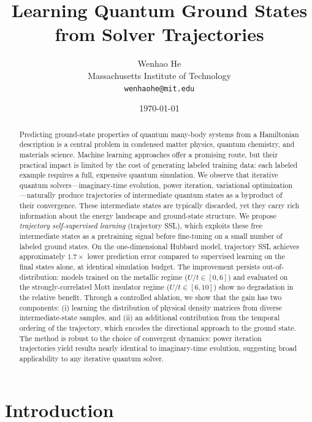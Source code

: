 \documentclass[12pt]{article}
\title{\textbf{Learning Quantum Ground States from Solver Trajectories}}
\author{Wenhao He\\
\small Massachusetts Institute of Technology\\
\small \texttt{wenhaohe@mit.edu}}
\date{\today}
\begin{document}
\maketitle

\begin{abstract}
Predicting ground-state properties of quantum many-body systems from a Hamiltonian
description is a central problem in condensed matter physics, quantum chemistry, and
materials science. Machine learning approaches offer a promising route, but their
practical impact is limited by the cost of generating labeled training data: each
labeled example requires a full, expensive quantum simulation.
We observe that iterative quantum solvers---imaginary-time evolution, power iteration,
variational optimization---naturally produce trajectories of intermediate quantum states
as a byproduct of their convergence.
These intermediate states are typically discarded, yet they carry rich information about
the energy landscape and ground-state structure.
We propose \emph{trajectory self-supervised learning} (trajectory SSL), which exploits
these free intermediate states as a pretraining signal before fine-tuning on a small
number of labeled ground states.
On the one-dimensional Hubbard model, trajectory SSL achieves approximately $1.7\times$
lower prediction error compared to supervised learning on the final states alone,
at identical simulation budget.
The improvement persists out-of-distribution: models trained on the metallic regime
($U/t\!\in\![0,6]$) and evaluated on the strongly-correlated Mott insulator regime
($U/t\!\in\![6,10]$) show no degradation in the relative benefit.
Through a controlled ablation, we show that the gain has two components:
(i) learning the distribution of physical density matrices from diverse
intermediate-state samples, and (ii) an additional contribution from the
temporal ordering of the trajectory, which encodes the directional approach to
the ground state.
The method is robust to the choice of convergent dynamics: power iteration
trajectories yield results nearly identical to imaginary-time evolution,
suggesting broad applicability to any iterative quantum solver.
\end{abstract}

\section{Introduction}
\label{sec:intro}
\end{document}
